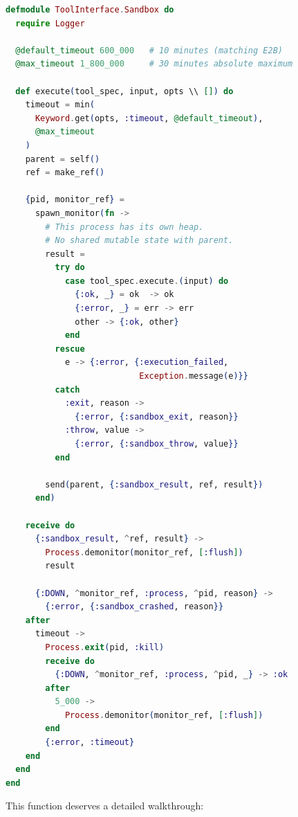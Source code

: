 \documentclass[12pt,a4paper]{article}
\theoremstyle{plain}
\theoremstyle{definition}
\begin{document}
\begin{lstlisting}[language=elixir, caption={Complete sandbox executor with monitored process isolation.}, label={lst:sandbox-execute}]
defmodule ToolInterface.Sandbox do
  require Logger

  @default_timeout 600_000   # 10 minutes (matching E2B)
  @max_timeout 1_800_000     # 30 minutes absolute maximum

  def execute(tool_spec, input, opts \\ []) do
    timeout = min(
      Keyword.get(opts, :timeout, @default_timeout),
      @max_timeout
    )
    parent = self()
    ref = make_ref()

    {pid, monitor_ref} =
      spawn_monitor(fn ->
        # This process has its own heap.
        # No shared mutable state with parent.
        result =
          try do
            case tool_spec.execute.(input) do
              {:ok, _} = ok  -> ok
              {:error, _} = err -> err
              other -> {:ok, other}
            end
          rescue
            e -> {:error, {:execution_failed,
                           Exception.message(e)}}
          catch
            :exit, reason ->
              {:error, {:sandbox_exit, reason}}
            :throw, value ->
              {:error, {:sandbox_throw, value}}
          end

        send(parent, {:sandbox_result, ref, result})
      end)

    receive do
      {:sandbox_result, ^ref, result} ->
        Process.demonitor(monitor_ref, [:flush])
        result

      {:DOWN, ^monitor_ref, :process, ^pid, reason} ->
        {:error, {:sandbox_crashed, reason}}
    after
      timeout ->
        Process.exit(pid, :kill)
        receive do
          {:DOWN, ^monitor_ref, :process, ^pid, _} -> :ok
        after
          5_000 ->
            Process.demonitor(monitor_ref, [:flush])
        end
        {:error, :timeout}
    end
  end
end
\end{lstlisting}

This function deserves a detailed walkthrough:
\end{document}

